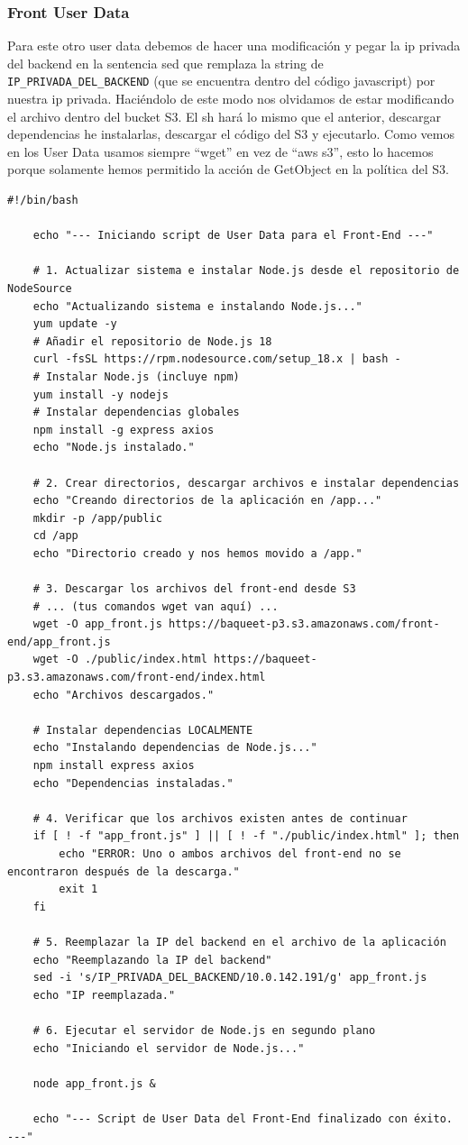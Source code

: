 \documentclass{article}
\begin{document}
	
	
	\newpage
	\subsubsection{Front User Data}

	Para este otro user data debemos de hacer una modificación y pegar la ip privada del backend en la sentencia sed que remplaza la string de \verb|IP_PRIVADA_DEL_BACKEND| (que se encuentra dentro del código javascript) por nuestra ip privada. Haciéndolo de este modo nos olvidamos de estar modificando el archivo dentro del bucket S3. El sh hará lo mismo que el anterior, descargar dependencias he instalarlas, descargar el código del S3 y ejecutarlo. Como vemos en los User Data usamos siempre ``wget'' en vez de ``aws s3'', esto lo hacemos porque solamente hemos permitido la acción de GetObject en la política del S3.
	
	\begin{lstlisting}[style=python-style, caption= front user data sh]
	#!/bin/bash

	echo "--- Iniciando script de User Data para el Front-End ---"

	# 1. Actualizar sistema e instalar Node.js desde el repositorio de NodeSource
	echo "Actualizando sistema e instalando Node.js..."
	yum update -y
	# Añadir el repositorio de Node.js 18
	curl -fsSL https://rpm.nodesource.com/setup_18.x | bash -
	# Instalar Node.js (incluye npm)
	yum install -y nodejs
	# Instalar dependencias globales
	npm install -g express axios
	echo "Node.js instalado."

	# 2. Crear directorios, descargar archivos e instalar dependencias
	echo "Creando directorios de la aplicación en /app..."
	mkdir -p /app/public
	cd /app
	echo "Directorio creado y nos hemos movido a /app."

	# 3. Descargar los archivos del front-end desde S3
	# ... (tus comandos wget van aquí) ...
	wget -O app_front.js https://baqueet-p3.s3.amazonaws.com/front-end/app_front.js
	wget -O ./public/index.html https://baqueet-p3.s3.amazonaws.com/front-end/index.html
	echo "Archivos descargados."

	# Instalar dependencias LOCALMENTE
	echo "Instalando dependencias de Node.js..."
	npm install express axios
	echo "Dependencias instaladas."

	# 4. Verificar que los archivos existen antes de continuar
	if [ ! -f "app_front.js" ] || [ ! -f "./public/index.html" ]; then
		echo "ERROR: Uno o ambos archivos del front-end no se encontraron después de la descarga."
		exit 1
	fi

	# 5. Reemplazar la IP del backend en el archivo de la aplicación
	echo "Reemplazando la IP del backend"
	sed -i 's/IP_PRIVADA_DEL_BACKEND/10.0.142.191/g' app_front.js
	echo "IP reemplazada."

	# 6. Ejecutar el servidor de Node.js en segundo plano
	echo "Iniciando el servidor de Node.js..."

	node app_front.js &

	echo "--- Script de User Data del Front-End finalizado con éxito. ---"\end{lstlisting}
\end{document}
